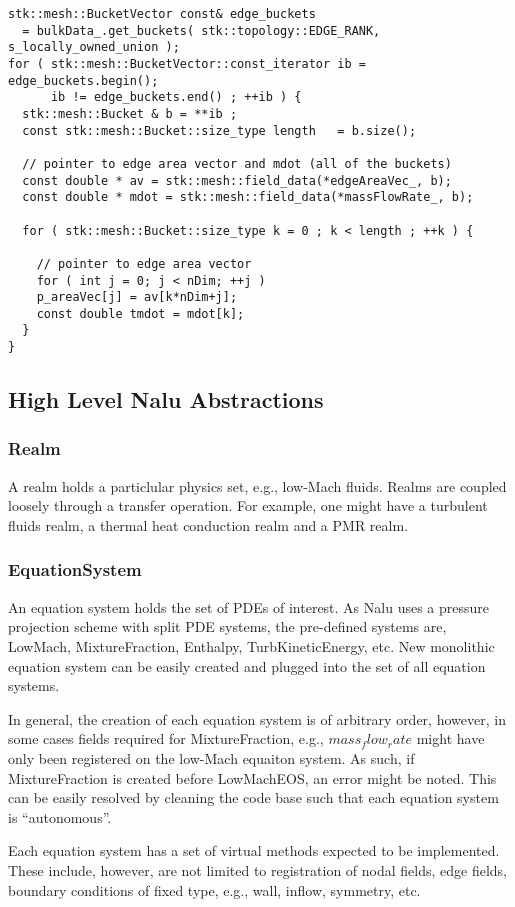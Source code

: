 \begin{lstlisting}
stk::mesh::BucketVector const& edge_buckets 
  = bulkData_.get_buckets( stk::topology::EDGE_RANK, s_locally_owned_union );
for ( stk::mesh::BucketVector::const_iterator ib = edge_buckets.begin();
      ib != edge_buckets.end() ; ++ib ) {
  stk::mesh::Bucket & b = **ib ;
  const stk::mesh::Bucket::size_type length   = b.size();

  // pointer to edge area vector and mdot (all of the buckets)
  const double * av = stk::mesh::field_data(*edgeAreaVec_, b);
  const double * mdot = stk::mesh::field_data(*massFlowRate_, b);
  
  for ( stk::mesh::Bucket::size_type k = 0 ; k < length ; ++k ) {
    
    // pointer to edge area vector
    for ( int j = 0; j < nDim; ++j )
    p_areaVec[j] = av[k*nDim+j];
    const double tmdot = mdot[k];
  }
}
\end{lstlisting}

\subsection{High Level Nalu Abstractions}

\subsubsection{Realm}
A realm holds a particlular physics set, e.g., low-Mach fluids. Realms are coupled
loosely through a transfer operation. For example, one might have a turbulent 
fluids realm, a thermal heat conduction realm and a PMR realm.

\subsubsection{EquationSystem}
An equation system holds the set of PDEs of interest. As Nalu uses a pressure projection
scheme with split PDE systems, the pre-defined systems are, LowMach, MixtureFraction,
Enthalpy, TurbKineticEnergy, etc. New monolithic equation system can be easily created and 
plugged into the set of all equation systems.

In general, the creation of each equation system is of arbitrary order, however, in some cases
fields required for MixtureFraction, e.g., $mass_flow_rate$ might have only been registered
on the low-Mach equaiton system. As such, if MixtureFraction is created before LowMachEOS,
an error might be noted. This can be easily resolved by cleaning the code base such that
each equation system is ``autonomous''.

Each equation system has a set of virtual methods expected to be implemented. These include, however,
are not limited to registration of nodal fields, edge fields, boundary conditions of fixed
type, e.g., wall, inflow, symmetry, etc.

